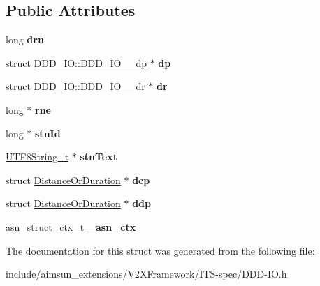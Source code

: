 \subsection*{Public Attributes}
\begin{DoxyCompactItemize}
\item 
long {\bfseries drn}\hypertarget{structDDD__IO_a3207bd0200ea15551a37426fd7559d68}{}\label{structDDD__IO_a3207bd0200ea15551a37426fd7559d68}

\item 
struct \hyperlink{structDDD__IO_1_1DDD__IO____dp}{D\+D\+D\+\_\+\+I\+O\+::\+D\+D\+D\+\_\+\+I\+O\+\_\+\+\_\+dp} $\ast$ {\bfseries dp}\hypertarget{structDDD__IO_ae2485ae0aa98873a09922af0546e1814}{}\label{structDDD__IO_ae2485ae0aa98873a09922af0546e1814}

\item 
struct \hyperlink{structDDD__IO_1_1DDD__IO____dr}{D\+D\+D\+\_\+\+I\+O\+::\+D\+D\+D\+\_\+\+I\+O\+\_\+\+\_\+dr} $\ast$ {\bfseries dr}\hypertarget{structDDD__IO_ae86ab664293b64a439f235391be852c5}{}\label{structDDD__IO_ae86ab664293b64a439f235391be852c5}

\item 
long $\ast$ {\bfseries rne}\hypertarget{structDDD__IO_ac816467d6dc5f926273f69a47116edda}{}\label{structDDD__IO_ac816467d6dc5f926273f69a47116edda}

\item 
long $\ast$ {\bfseries stn\+Id}\hypertarget{structDDD__IO_a4b698c9c9a44e77bab2729deca5d8b64}{}\label{structDDD__IO_a4b698c9c9a44e77bab2729deca5d8b64}

\item 
\hyperlink{structOCTET__STRING}{U\+T\+F8\+String\+\_\+t} $\ast$ {\bfseries stn\+Text}\hypertarget{structDDD__IO_a5a6a44ac090feb92f85c2da08e64b9eb}{}\label{structDDD__IO_a5a6a44ac090feb92f85c2da08e64b9eb}

\item 
struct \hyperlink{structDistanceOrDuration}{Distance\+Or\+Duration} $\ast$ {\bfseries dcp}\hypertarget{structDDD__IO_aba6ef761e50dfabd7bed8c04a2d09c12}{}\label{structDDD__IO_aba6ef761e50dfabd7bed8c04a2d09c12}

\item 
struct \hyperlink{structDistanceOrDuration}{Distance\+Or\+Duration} $\ast$ {\bfseries ddp}\hypertarget{structDDD__IO_ad9a638fbb3b41092a52679b558e37223}{}\label{structDDD__IO_ad9a638fbb3b41092a52679b558e37223}

\item 
\hyperlink{structasn__struct__ctx__s}{asn\+\_\+struct\+\_\+ctx\+\_\+t} {\bfseries \+\_\+asn\+\_\+ctx}\hypertarget{structDDD__IO_a39c750a029c2f0750535164505316738}{}\label{structDDD__IO_a39c750a029c2f0750535164505316738}

\end{DoxyCompactItemize}


The documentation for this struct was generated from the following file\+:\begin{DoxyCompactItemize}
\item 
include/aimsun\+\_\+extensions/\+V2\+X\+Framework/\+I\+T\+S-\/spec/D\+D\+D-\/\+I\+O.\+h\end{DoxyCompactItemize}
